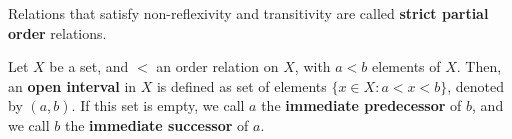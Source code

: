 \documentclass[a4paper,english,12pt]{article}
\begin{document}
\begin{defn} Relations that satisfy non-reflexivity and  transitivity are called \textbf{strict partial order} relations.
\end{defn}
\begin{defn} Let $X$ be a set, and $<$ an order relation on $X$, with $a < b$ elements of $X$. Then, an \textbf{open interval} in $X$ is defined as set of elements $\{x \in X : a < x < b\}$, denoted by $(a, b)$. If this set is empty, we call $a$ the \textbf{immediate predecessor} of $b$, and we call $b$ the \textbf{immediate successor} of $a$.
\end{defn}
\end{document}
